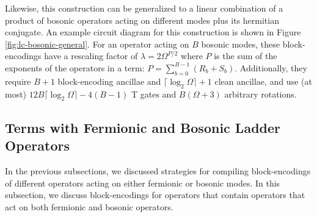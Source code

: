 \begin{figure*}
    
    \caption{
        \textbf{Generalized Block-Encoding Product of Bosonic Ladder Operators Plus Hermitian Conjugate}
        A block-encoding for the operator $((a_i^\dagger)^{R_i} + a_i^{S_i})((a_j^\dagger)^{R_j} + a_j^{S_j})...((a_m^\dagger)^{R_m} + a_m^{S_m}) + h.c.$ is given.
    }
    \label{fig:lc-bosonic-general}
\end{figure*}

Likewise, this construction can be generalized to a linear combination of a product of bosonic operators acting on different modes plus its hermitian conjugate.
An example circuit diagram for this construction is shown in Figure \ref{fig:lc-bosonic-general}.
For an operator acting on $B$ bosonic modes, these block-encodings have a rescaling factor of $\lambda = 2 \Omega^{P/2}$ where $P$ is the sum of the exponents of the operators in a term: $P = \sum_{b=0}^{B-1}(R_b+S_b)$.
Additionally, they require $B+1$ block-encoding ancillae and $\lceil{\log_2{\Omega}}\rceil + 1$ clean ancillae, and use (at most)  $12B \lceil \log_2 \Omega \rceil - 4(B - 1)$ T gates and $B(\Omega + 3)$ arbitrary rotations.


\subsection{Terms with Fermionic and Bosonic Ladder Operators}

In the previous subsections, we discussed strategies for compiling block-encodings of different operators acting on either fermionic or bosonic modes.
In this subsection, we discuss block-encodings for operators that contain operators that act on both fermionic and bosonic operators.

\begin{figure*}
    
    
    
    \caption{
        \textbf{Block-Encoding Terms}
        In (a), a block-encoding for the operator $b_i^\dagger a_j^\dagger + a_j b_i$ is given.
        In (b), a block-encoding for the operator $ b_i^\dagger b_j^\dagger a_k^\dagger + a_k b_j b_i$ is given.
        In (c), a block-encoding for the operator $b_i^\dagger b_j^\dagger a_k^\dagger a_l^\dagger + a_l a_k b_j b_i$ is given.
    }
    \label{fig:be-term-example}
\end{figure*}


